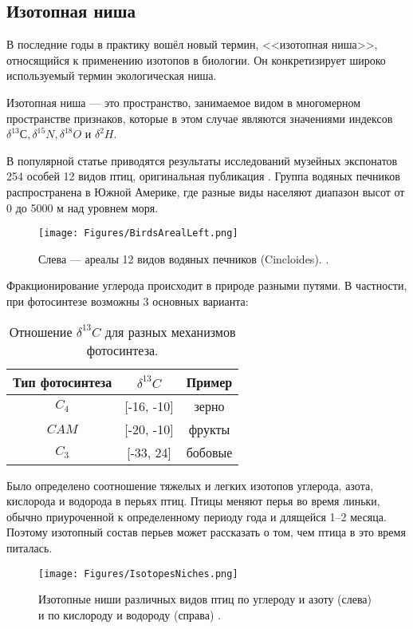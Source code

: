 \documentclass[a5paper,openany]{book}
\begin{document}

\subsection{Изотопная ниша}\label{s:IsotopeNiche}

В последние годы в практику вошёл новый термин, <<изотопная ниша>>, относящийся к применению изотопов в биологии. Он конкретизирует широко используемый термин экологическая ниша. 

Изотопная ниша — это пространство, занимаемое видом в многомерном пространстве признаков, которые в этом случае являются значениями индексов $\delta^{13}С, \delta^{15}N, \delta^{18}O \text{ и } \delta^{2}H$. 

В популярной статье \cite{OpaevIsotope} приводятся результаты исследований музейных экспонатов 254 особей 12 видов птиц, оригинальная публикация \cite{Rader2017}.  Группа водяных печников распространена в Южной Америке, где разные виды населяют диапазон высот от 0 до 5000 м над уровнем моря.
\begin{figure}[ht] 
	\centering\small
	\unitlength=1mm
	{\texttt{[image: Figures/BirdsArealLeft.png]}} 
	\caption {Слева — ареалы 12 видов водяных печников (Cincloides). \cite{Rader2017}.} %
	\label{f:BirdsAreal}
\end{figure}

Фракционирование углерода происходит в природе разными путями. В частности, при фотосинтезе возможны 3 основных варианта: 
\begin{table}[h!]
	\centering
	\caption{Отношение $\delta^{13}C$ для разных механизмов фотосинтеза.} 
	\medskip 
	\begin{tabular}{|c|c|c|}
		\hline
		Тип фотосинтеза & $\delta^{13}C$ & Пример \\
		\hline 
		$C_4$ & [-16, -10] & зерно \\
		$CAM$ & [-20, -10] & фрукты\\
		$C_3$ & [-33, 24] & бобовые \\			
		\hline
	\end{tabular}
	\label{13Cplants}
\end{table} 

Было определено соотношение тяжелых и легких изотопов углерода, азота, кислорода и водорода в  перьях птиц. Птицы меняют перья во время линьки, обычно приуроченной к определенному периоду года и длящейся 1–2 месяца. Поэтому изотопный состав перьев может рассказать о том, чем птица в это время питалась. 
\begin{figure}[ht] 
	\centering\small
	\unitlength=1mm
	{\texttt{[image: Figures/IsotopesNiches.png]}} 
	\caption{Изотопные ниши различных видов птиц по углероду и азоту (слева) и по кислороду и водороду (справа) \cite{Rader2017}.} 
	\label{f:IsotopesNiches}
\end{figure}
\end{document}
